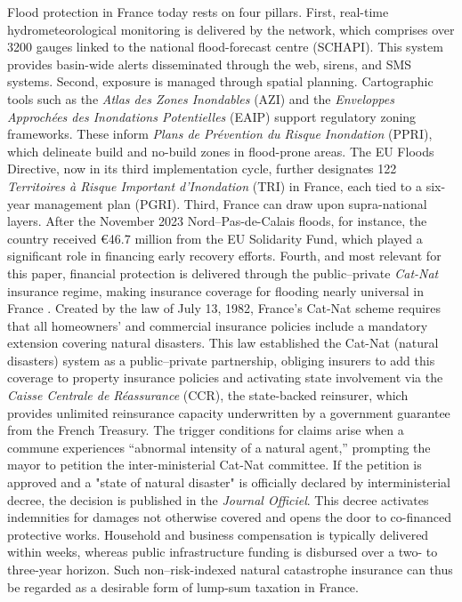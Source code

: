 Flood protection in France today rests on four pillars. First, real-time hydrometeorological monitoring is delivered by the  network, which comprises over 3200 gauges linked to the national flood-forecast centre (SCHAPI). This system provides basin-wide alerts disseminated through the web, sirens, and SMS systems. Second, exposure is managed through spatial planning. Cartographic tools such as the \emph{Atlas des Zones Inondables} (AZI) and the \emph{Enveloppes Approchées des Inondations Potentielles} (EAIP) support regulatory zoning frameworks. These inform \emph{Plans de Prévention du Risque Inondation} (PPRI), which delineate build and no-build zones in flood-prone areas. The EU Floods Directive, now in its third implementation cycle, further designates 122 \emph{Territoires à Risque Important d’Inondation} (TRI) in France, each tied to a six-year management plan (PGRI). Third, France can draw upon supra-national layers. After the November 2023 Nord–Pas-de-Calais floods, for instance, the country received €46.7 million from the EU Solidarity Fund, which played a significant role in financing early recovery efforts. Fourth, and most relevant for this paper, financial protection is delivered through the public–private \emph{Cat-Nat} insurance regime, making insurance coverage for flooding nearly universal in France \citep{bock2024flood}. Created by the law of July 13, 1982, France’s Cat-Nat scheme requires that all homeowners’ and commercial insurance policies include a mandatory extension covering natural disasters. This law established the Cat-Nat (natural disasters) system as a public–private partnership, obliging insurers to add this coverage to property insurance policies and activating state involvement via the \textit{Caisse Centrale de Réassurance} (CCR), the state-backed reinsurer, which provides unlimited reinsurance capacity underwritten by a government guarantee from the French Treasury. The trigger conditions for claims arise when a commune experiences “abnormal intensity of a natural agent,” prompting the mayor to petition the inter-ministerial Cat-Nat committee. If the petition is approved and a "state of natural disaster" is officially declared by interministerial decree, the decision is published in the \emph{Journal Officiel}. This decree activates indemnities for damages not otherwise covered and opens the door to co-financed protective works. Household and business compensation is typically delivered within weeks, whereas public infrastructure funding is disbursed over a two- to three-year horizon. Such non–risk-indexed natural catastrophe insurance can thus be regarded as a desirable form of lump-sum taxation in France. \\


